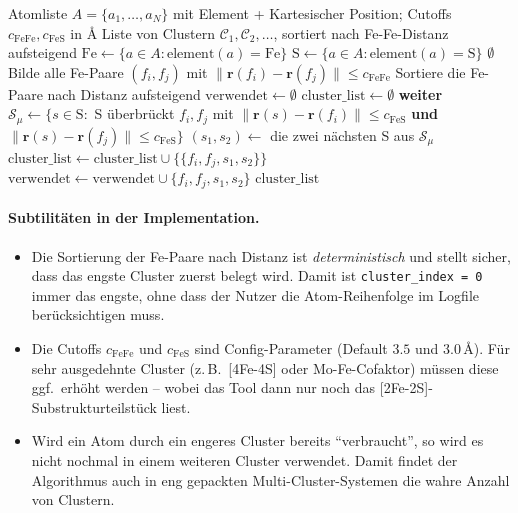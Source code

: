 \documentclass[11pt,a4paper,twoside]{article}
\providecommand{\angstrom}{\text{\AA}}    %
\theoremstyle{remark}
\begin{document}
\begin{algorithm}[H]
\caption{\textsc{FindAllClusters}}
\begin{algorithmic}[1]
\Require Atomliste $A = \{a_1, \ldots, a_N\}$ mit Element + Kartesischer Position;
         Cutoffs $c_\text{FeFe}, c_\text{FeS}$ in $\angstrom$
\Ensure Liste von Clustern $\mathcal{C}_1, \mathcal{C}_2, \ldots$,
        sortiert nach Fe-Fe-Distanz aufsteigend
\State $\text{Fe} \gets \{a \in A : \text{element}(a) = \text{Fe}\}$
\State $\text{S}  \gets \{a \in A : \text{element}(a) = \text{S}\}$
  \State \Return $\emptyset$  
\EndIf
\State Bilde alle Fe-Paare $(f_i, f_j)$ mit
       $\|\mathbf{r}(f_i) - \mathbf{r}(f_j)\| \leq c_\text{FeFe}$
\State Sortiere die Fe-Paare nach Distanz aufsteigend
\State $\text{verwendet} \gets \emptyset$  
\State $\text{cluster\_list} \gets \emptyset$
    \State \textbf{weiter}  
  \EndIf
  \State $\mathcal{S}_\mu \gets \{s \in \text{S} :$ S \"uberbr\"uckt $f_i, f_j$
         mit $\|\mathbf{r}(s) - \mathbf{r}(f_i)\| \leq c_\text{FeS}$
         \textbf{und} $\|\mathbf{r}(s) - \mathbf{r}(f_j)\| \leq c_\text{FeS}\}$
    
    \State $(s_1, s_2) \gets$ die zwei n\"achsten S aus $\mathcal{S}_\mu$
    \State $\text{cluster\_list} \gets \text{cluster\_list} \cup
           \{\{f_i, f_j, s_1, s_2\}\}$
    \State $\text{verwendet} \gets \text{verwendet} \cup \{f_i, f_j, s_1, s_2\}$
  \EndIf
\EndFor
\State \Return $\text{cluster\_list}$
\end{algorithmic}
\end{algorithm}

\paragraph{Subtilit\"aten in der Implementation.}
\begin{itemize}\setlength{\itemsep}{0pt}
  \item Die Sortierung der Fe-Paare nach Distanz ist
        \emph{deterministisch} und stellt sicher, dass das engste
        Cluster zuerst belegt wird. Damit ist
        \texttt{cluster\_index = 0} immer das engste, ohne dass der
        Nutzer die Atom-Reihenfolge im Logfile ber\"ucksichtigen muss.
  \item Die Cutoffs $c_\text{FeFe}$ und $c_\text{FeS}$ sind
        Config-Parameter (Default $3.5$ und $3.0\,\angstrom$). F\"ur
        sehr ausgedehnte Cluster (z.\,B.\ [4Fe-4S] oder Mo-Fe-Cofaktor)
        m\"ussen diese ggf.\ erh\"oht werden -- wobei das Tool dann nur
        noch das [2Fe-2S]-Substrukturteilst\"uck liest.
  \item Wird ein Atom durch ein engeres Cluster bereits "`verbraucht"',
        so wird es nicht nochmal in einem weiteren Cluster verwendet.
        Damit findet der Algorithmus auch in eng gepackten
        Multi-Cluster-Systemen die wahre Anzahl von Clustern.
\end{itemize}
\end{document}
